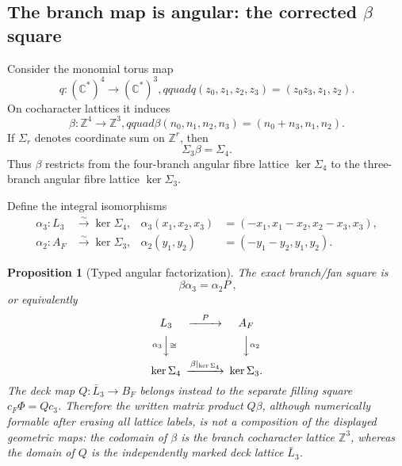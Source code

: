 \documentclass[11pt]{article}
\newtheorem{proposition}[theorem]{Proposition}
\theoremstyle{definition}
\theoremstyle{remark}
\numberwithin{equation}{section}
\begin{document}
\subsection{The branch map is angular: the corrected \texorpdfstring{\(\beta\)}{beta} square}
\label{subsec:rank6-beta-square}

Consider the monomial torus map
\[
 q:(\mathbb C^*)^4\longrightarrow(\mathbb C^*)^3,qquad
 q(z_0,z_1,z_2,z_3)=(z_0z_3,z_1,z_2).
\]
On cocharacter lattices it induces
\begin{equation}
 \beta:\mathbb Z^4\longrightarrow\mathbb Z^3,qquad
 \beta(n_0,n_1,n_2,n_3)=(n_0+n_3,n_1,n_2).             \label{eq:rank6-beta}
\end{equation}
If \(\Sigma_r\) denotes coordinate sum on \(\mathbb Z^r\), then
\begin{equation}
 \Sigma_3\beta=\Sigma_4.                                \label{eq:rank6-sum-square}
\end{equation}
Thus \(\beta\) restricts from the four-branch angular fibre lattice
\(\ker\Sigma_4\) to the three-branch angular fibre lattice
\(\ker\Sigma_3\).

Define the integral isomorphisms
\begin{align}
 \alpha_3:L_3&\xrightarrow{\sim}\ker\Sigma_4,&
 \alpha_3(x_1,x_2,x_3)
 &=(-x_1,x_1-x_2,x_2-x_3,x_3),                          \label{eq:rank6-alpha3}\\
 \alpha_2:A_F&\xrightarrow{\sim}\ker\Sigma_3,&
 \alpha_2(y_1,y_2)&=(-y_1-y_2,y_1,y_2).                 \label{eq:rank6-alpha2}
\end{align}

\begin{proposition}[Typed angular factorization]
\label{prop:rank6-beta-p}
The exact branch/fan square is
\begin{equation}
 \boxed{\ \beta\alpha_3=\alpha_2P\ },                 \label{eq:rank6-beta-p}
\end{equation}
or equivalently
\[
 \begin{CD}
 L_3 @>{P}>> A_F\\
 @V{\alpha_3}V{\cong}V @VV{\alpha_2}V\\
 \ker\Sigma_4 @>{\beta|_{\ker\Sigma_4}}>> \ker\Sigma_3.
 \end{CD}
\]
The deck map \(Q:\bar L_3\to B_F\) belongs instead to the separate filling
square \(c_F\Phi=Qc_3\).  Therefore the written matrix product \(Q\beta\),
although numerically formable after erasing all lattice labels, is not a
composition of the displayed geometric maps: the codomain of \(\beta\) is
the branch cocharacter lattice \(\mathbb Z^3\), whereas the domain of \(Q\)
is the independently marked deck lattice \(\bar L_3\).
\end{proposition}
\end{document}
